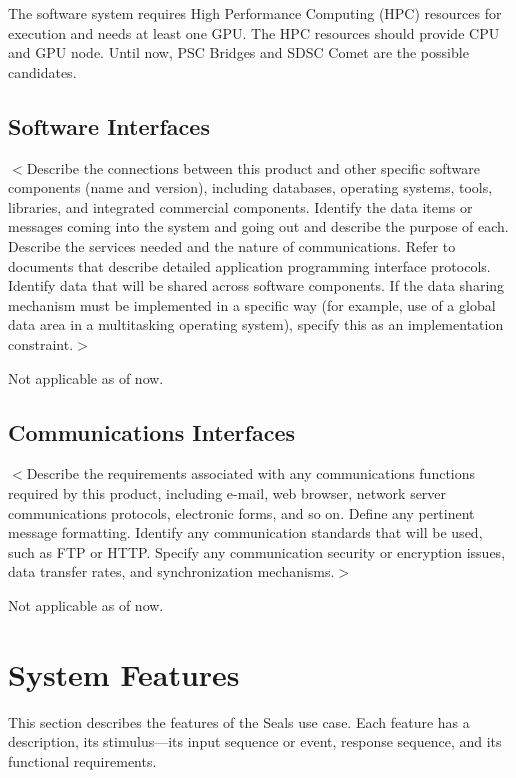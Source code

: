 \documentclass{scrreprt}
\begin{document}
The software system requires High Performance Computing (HPC) resources for execution 
and needs at least one GPU. The HPC resources should provide CPU and GPU node. 
Until now, PSC Bridges and SDSC Comet are the possible candidates.

\section{Software Interfaces}
$<$Describe the connections between this product and other specific software 
components (name and version), including databases, operating systems, tools, 
libraries, and integrated commercial components. Identify the data items or 
messages coming into the system and going out and describe the purpose of each.  
Describe the services needed and the nature of communications. Refer to 
documents that describe detailed application programming interface protocols.  
Identify data that will be shared across software components. If the data 
sharing mechanism must be implemented in a specific way (for example, use of a 
global data area in a multitasking operating system), specify this as an 
implementation constraint.$>$

Not applicable as of now.


\section{Communications Interfaces}
$<$Describe the requirements associated with any communications functions 
required by this product, including e-mail, web browser, network server 
communications protocols, electronic forms, and so on. Define any pertinent 
message formatting. Identify any communication standards that will be used, such 
as FTP or HTTP. Specify any communication security or encryption issues, data 
transfer rates, and synchronization mechanisms.$>$

Not applicable as of now.

\chapter{System Features}

This section describes the features of the Seals use case. Each feature has a
description, its stimulus---its input sequence or event, response sequence, and
its functional requirements.
\end{document}
